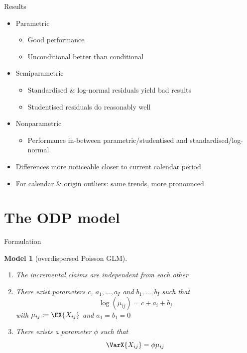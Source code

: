 \documentclass[tikz]{beamer}
\newtheorem{model}{Model}
\begin{document}
\begin{frame}{Results}
  \begin{itemize}
    \item Parametric
          \begin{itemize}
            \item Good performance
            \item Unconditional better than conditional
          \end{itemize}
    \item Semiparametric
          \begin{itemize}
            \item Standardised \& log-normal residuals yield bad results
            \item Studentised residuals do reasonably well
          \end{itemize}
    \item Nonparametric
          \begin{itemize}
            \item Performance in-between parametric/studentised and standardised/log-normal
          \end{itemize}
    \item Differences more noticeable closer to current calendar period
    \item For calendar \& origin outliers: same trends, more pronounced
  \end{itemize}
\end{frame}

\section{The ODP model}

\begin{frame}{Formulation}
  \begin{model}[overdispersed Poisson GLM]
    \begin{enumerate}
      \item The incremental claims are independent from each other
      \item There exist parameters $c$, $a_1, \dots, a_I$ and $b_1, \dots, b_I$ such that
            \begin{equation*}
              \log(\mu_{ij}) = c + a_i + b_j
            \end{equation*}
            with $\mu_{ij} \coloneqq \EX{X_{ij}}$ and $a_1 = b_1 = 0$
      \item There exists a parameter $\phi$ such that
            \begin{equation*}
              \VarX{X_{ij}} = \phi \mu_{ij}
            \end{equation*}
    \end{enumerate}
  \end{model}
\end{frame}
\end{document}
